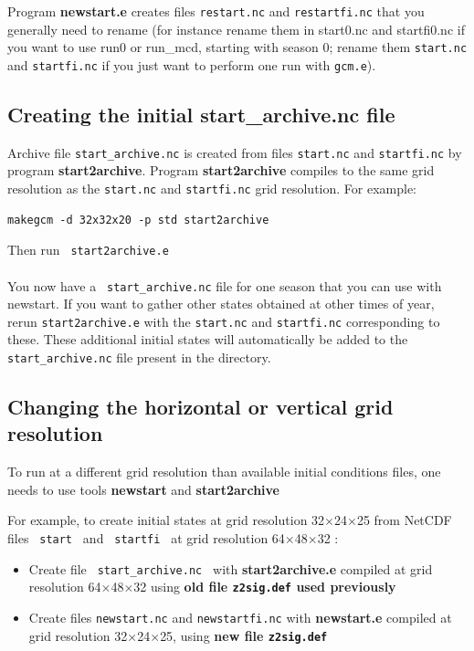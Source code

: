 

Program {\bf newstart.e} creates files
{\tt restart.nc} and {\tt restartfi.nc}
that you generally need to rename (for instance rename them in start0.nc
and startfi0.nc if you want to use run0 or run\_mcd, starting with season 0;
rename them {\tt start.nc} and {\tt startfi.nc} if you just want to perform
one run with {\tt gcm.e}).


\subsection{Creating the initial start\_archive.nc file }

Archive file
{\tt start\_archive.nc} is created from files
{\tt start.nc} and {\tt startfi.nc} by program {\bf start2archive}.
Program {\bf start2archive} compiles to the same grid resolution as the
{\tt start.nc} and {\tt startfi.nc} grid resolution. For example:

\begin{verbatim}
makegcm -d 32x32x20 -p std start2archive
\end{verbatim}
Then run \verb+ start2archive.e+ \\ \\
You now have a \verb+ start_archive.nc+ file for one season that you can
use with newstart.
If you want to gather other states obtained at other times of year, rerun
{\tt start2archive.e} with the {\tt start.nc} and {\tt startfi.nc}
 corresponding to these.
These additional initial states will automatically be added to the
{\tt start\_archive.nc} file present in the directory.

\subsection{Changing the horizontal or vertical grid resolution}

To run at a different grid resolution than available initial conditions
files, one needs to use tools {\bf newstart} and {\bf start2archive}

For example, to create initial states at grid resolution
32$\times$24$\times$25 from NetCDF files
\verb+ start + and \verb+ startfi + at grid resolution
  64$\times$48$\times$32 :

\begin{itemize}
\item Create file \verb+ start_archive.nc +
with {\bf start2archive.e} compiled at grid resolution
64$\times$48$\times$32 using {\bf old file {\tt z2sig.def}
 used previously}

\item Create files
{\tt newstart.nc} and {\tt newstartfi.nc}
 with {\bf newstart.e}
compiled at grid resolution 32$\times$24$\times$25,
using {\bf new file {\tt z2sig.def}}

\end{itemize}

